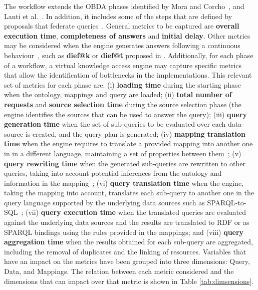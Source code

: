 The workflow extends the OBDA phases identified by Mora and Corcho~\citep{mora2013towards}, and Lanti et al.~\citep{lanti2015npd}. In addition, it includes some of the steps that are defined by proposals that federate queries~\citep{schwarte2011fedx}. 
General metrics to be captured are \textbf{overall execution time}, \textbf{completeness of answers} and \textbf{initial delay}. Other metrics may be considered when the engine generates answers following a continuous behaviour~\citep{sharaf2008algorithms}, such as \textbf{dief@k} or \textbf{dief@t} proposed in \citep{acosta2017diefficiency}. Additionally, for each phase of a workflow, a virtual knowledge access engine may capture specific metrics that allow the identification of bottlenecks in the implementations. This relevant set of metrics for each phase are: (i) \textbf{loading time} during the starting phase when the ontology, mappings and query are loaded; (ii) \textbf{total number of requests} and  \textbf{source selection time} during the source selection phase (the engine identifies the sources that can be used to answer the query); (iii) \textbf{query generation time} when the set of sub-queries to be evaluated over each data source is created, and the query plan is generated; (iv) \textbf{mapping translation time} when the engine requires to translate a provided mapping into another one in in a different language, maintaining a set of properties between them~\citep{corcho2019towards}; (v) \textbf{query rewriting time} when the generated sub-queries are rewritten to other queries, taking into account potential inferences from the ontology and information in the mapping~\citep{mora2014kyrie2}; (vi) \textbf{query translation time} when the engine, taking the mapping into account, translates each sub-query to another one in the query language supported by the underlying data sources such as SPARQL-to-SQL~\citep{chebotko2009semantics}; (vii) \textbf{query execution time} when the translated queries are evaluated against the underlying data sources and the results are translated to RDF or as SPARQL bindings using the rules provided in the mappings; and (viii) \textbf{query aggregation time} when the results obtained for each sub-query are aggregated, including the removal of duplicates and the linking of resources. 
Variables that have an impact on the metrics %
have been grouped into three dimensions: Query, Data, and Mappings. %
The relation between each  metric considered  and the dimensions that can impact over that metric is  shown in Table \ref{tab:dimsensions}.

